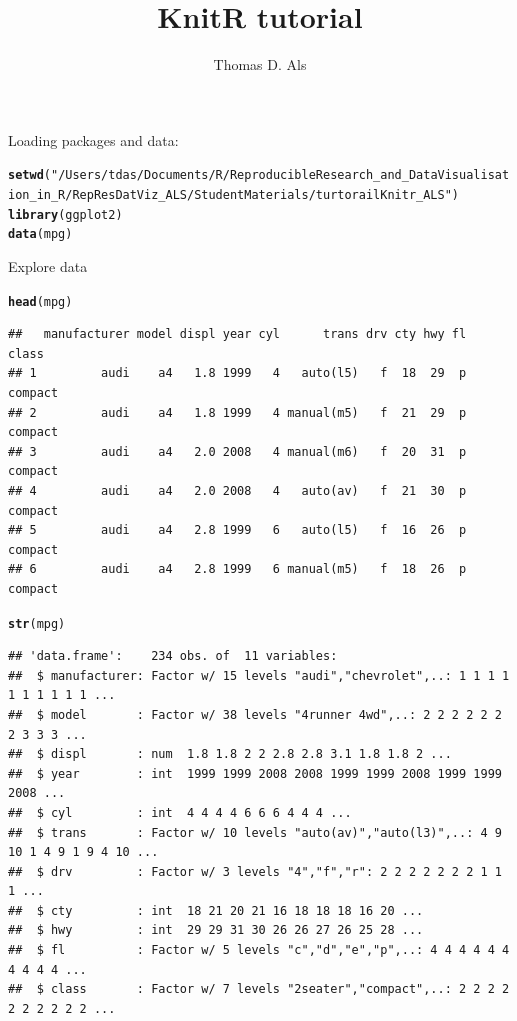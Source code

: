 \documentclass{article}\usepackage[]{graphicx}\usepackage[]{color}
\title{KnitR tutorial}
\author{Thomas D. Als}
\makeatletter
\newcommand{\hlstr}[1]{\textcolor[rgb]{0.192,0.494,0.8}{#1}}%
\newcommand{\hlstd}[1]{\textcolor[rgb]{0.345,0.345,0.345}{#1}}%
\newcommand{\hlkwd}[1]{\textcolor[rgb]{0.737,0.353,0.396}{\textbf{#1}}}%
\newenvironment{kframe}{%
 \def\at@end@of@kframe{}%
 \ifinner\ifhmode%
  \def\at@end@of@kframe{\end{minipage}}%
  \begin{minipage}{\columnwidth}%
 \fi\fi%
 \def\FrameCommand##1{\hskip\@totalleftmargin \hskip-\fboxsep
 \colorbox{shadecolor}{##1}\hskip-\fboxsep
     \hskip-\linewidth \hskip-\@totalleftmargin \hskip\columnwidth}%
 \MakeFramed {\advance\hsize-\width
   \@totalleftmargin\z@ \linewidth\hsize
   \@setminipage}}%
 {\par\unskip\endMakeFramed%
 \at@end@of@kframe}
\newenvironment{knitrout}{}{} %
\makeatother
\begin{document}
\maketitle

Loading packages and data:
\begin{knitrout}
\color{fgcolor}\begin{kframe}
\begin{alltt}
\hlkwd{setwd}\hlstd{(}\hlstr{"/Users/tdas/Documents/R/ReproducibleResearch_and_DataVisualisation_in_R/RepResDatViz_ALS/StudentMaterials/turtorailKnitr_ALS"}\hlstd{)}
\hlkwd{library}\hlstd{(ggplot2)}
\hlkwd{data}\hlstd{(mpg)}
\end{alltt}
\end{kframe}
\end{knitrout}

Explore data
\begin{knitrout}
\color{fgcolor}\begin{kframe}
\begin{alltt}
\hlkwd{head}\hlstd{(mpg)}
\end{alltt}
\begin{verbatim}
##   manufacturer model displ year cyl      trans drv cty hwy fl   class
## 1         audi    a4   1.8 1999   4   auto(l5)   f  18  29  p compact
## 2         audi    a4   1.8 1999   4 manual(m5)   f  21  29  p compact
## 3         audi    a4   2.0 2008   4 manual(m6)   f  20  31  p compact
## 4         audi    a4   2.0 2008   4   auto(av)   f  21  30  p compact
## 5         audi    a4   2.8 1999   6   auto(l5)   f  16  26  p compact
## 6         audi    a4   2.8 1999   6 manual(m5)   f  18  26  p compact
\end{verbatim}
\begin{alltt}
\hlkwd{str}\hlstd{(mpg)}
\end{alltt}
\begin{verbatim}
## 'data.frame':	234 obs. of  11 variables:
##  $ manufacturer: Factor w/ 15 levels "audi","chevrolet",..: 1 1 1 1 1 1 1 1 1 1 ...
##  $ model       : Factor w/ 38 levels "4runner 4wd",..: 2 2 2 2 2 2 2 3 3 3 ...
##  $ displ       : num  1.8 1.8 2 2 2.8 2.8 3.1 1.8 1.8 2 ...
##  $ year        : int  1999 1999 2008 2008 1999 1999 2008 1999 1999 2008 ...
##  $ cyl         : int  4 4 4 4 6 6 6 4 4 4 ...
##  $ trans       : Factor w/ 10 levels "auto(av)","auto(l3)",..: 4 9 10 1 4 9 1 9 4 10 ...
##  $ drv         : Factor w/ 3 levels "4","f","r": 2 2 2 2 2 2 2 1 1 1 ...
##  $ cty         : int  18 21 20 21 16 18 18 18 16 20 ...
##  $ hwy         : int  29 29 31 30 26 26 27 26 25 28 ...
##  $ fl          : Factor w/ 5 levels "c","d","e","p",..: 4 4 4 4 4 4 4 4 4 4 ...
##  $ class       : Factor w/ 7 levels "2seater","compact",..: 2 2 2 2 2 2 2 2 2 2 ...
\end{verbatim}
\end{kframe}
\end{knitrout}
\end{document}
